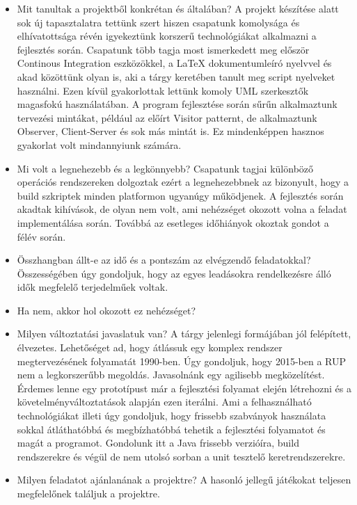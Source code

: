 \begin{itemize}
\item Mit tanultak a projektből konkrétan és általában? \newline
A projekt készítése alatt sok új tapasztalatra tettünk szert hiszen csapatunk komolysága és elhívatottsága révén igyekeztünk korszerű technológiákat alkalmazni a fejlesztés során. Csapatunk több tagja most ismerkedett meg először Continous Integration eszközökkel, a LaTeX dokumentumleíró nyelvvel és akad közöttünk olyan is, aki a tárgy keretében tanult meg script nyelveket használni. Ezen kívül gyakorlottak lettünk komoly UML szerkesztők magasfokú használatában. 
A program fejlesztése során sűrűn alkalmaztunk tervezési mintákat, például az előírt Visitor patternt, de alkalmaztunk Observer, Client-Server és sok más mintát is. Ez mindenképpen hasznos gyakorlat volt mindannyiunk számára.

\item Mi volt a legnehezebb és a legkönnyebb? \newline
Csapatunk tagjai különböző operációs rendszereken dolgoztak ezért a legnehezebbnek az bizonyult, hogy a build szkriptek minden platformon ugyanúgy működjenek. A fejlesztés során akadtak kihívások, de olyan nem volt, ami nehézséget okozott volna a feladat implementálása során. Továbbá az esetleges időhiányok okoztak gondot a félév során.

\item Összhangban állt-e az idő és a pontszám az elvégzendő feladatokkal? \newline
Összességében úgy gondoljuk, hogy az egyes leadásokra rendelkezésre álló idők megfelelő terjedelműek voltak.

\item Ha nem, akkor hol okozott ez nehézséget? \newline
\item Milyen változtatási javaslatuk van? \newline
A tárgy jelenlegi formájában jól felépített, élvezetes. Lehetőséget ad, hogy átlássuk egy komplex rendszer megtervezésének folyamatát 1990-ben.
Úgy gondoljuk, hogy 2015-ben a RUP nem a legkorszerűbb megoldás. Javasolnánk egy agilisebb megközelítést. Érdemes lenne egy prototípust már a fejlesztési folyamat elején létrehozni és a követelményváltoztatások alapján ezen iterálni.
Ami a felhasználható technológiákat illeti úgy gondoljuk, hogy frissebb szabványok használata sokkal átláthatóbbá és megbízhatóbbá tehetik a fejlesztési folyamatot és magát a programot. Gondolunk itt a Java frissebb verzióíra, build rendszerekre és végül de nem utolsó sorban a unit tesztelő keretrendszerekre. 

\item Milyen feladatot ajánlanának a projektre? \newline
A hasonló jellegű játékokat teljesen megfelelőnek találjuk a projektre.

\end{itemize}


